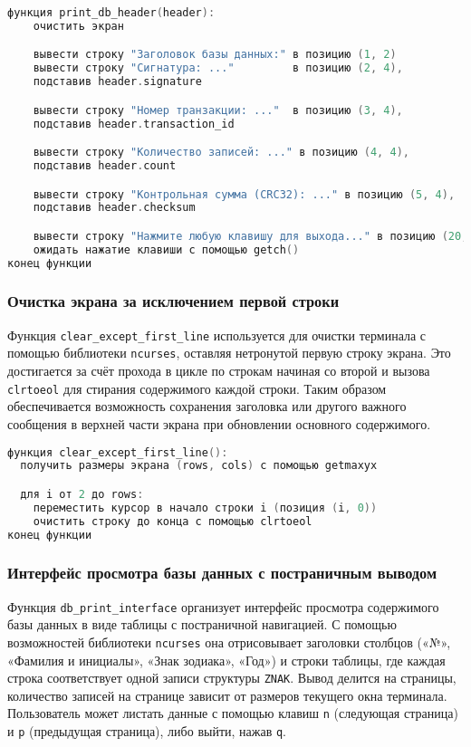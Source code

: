 \begin{lstlisting}[language=C, caption=Функция print\_db\_header]
функция print_db_header(header):
    очистить экран

    вывести строку "Заголовок базы данных:" в позицию (1, 2)
    вывести строку "Сигнатура: ..."         в позицию (2, 4),
    подставив header.signature

    вывести строку "Номер транзакции: ..."  в позицию (3, 4), 
    подставив header.transaction_id

    вывести строку "Количество записей: ..." в позицию (4, 4), 
    подставив header.count

    вывести строку "Контрольная сумма (CRC32): ..." в позицию (5, 4),
    подставив header.checksum

    вывести строку "Нажмите любую клавишу для выхода..." в позицию (20, 2)
    ожидать нажатие клавиши с помощью getch()
конец функции

\end{lstlisting}

\subsubsection*{Очистка экрана за исключением первой строки}
Функция \texttt{clear\_except\_first\_line} используется для очистки терминала с помощью библиотеки \texttt{ncurses}, оставляя нетронутой первую строку экрана. Это достигается за счёт прохода в цикле по строкам начиная со второй и вызова \texttt{clrtoeol} для стирания содержимого каждой строки. Таким образом обеспечивается возможность сохранения заголовка или другого важного сообщения в верхней части экрана при обновлении основного содержимого.

\begin{lstlisting}[language=C, caption=Функция clear\_except\_first\_line]
функция clear_except_first_line():
  получить размеры экрана (rows, cols) с помощью getmaxyx

  для i от 2 до rows:
    переместить курсор в начало строки i (позиция (i, 0))
    очистить строку до конца с помощью clrtoeol
конец функции
\end{lstlisting}

\subsubsection*{Интерфейс просмотра базы данных с постраничным выводом}
Функция \texttt{db\_print\_interface} организует интерфейс просмотра содержимого базы данных в виде таблицы с постраничной навигацией. С помощью возможностей библиотеки \texttt{ncurses} она отрисовывает заголовки столбцов («№», «Фамилия и инициалы», «Знак зодиака», «Год») и строки таблицы, где каждая строка соответствует одной записи структуры \texttt{ZNAK}. Вывод делится на страницы, количество записей на странице зависит от размеров текущего окна терминала. Пользователь может листать данные с помощью клавиш \texttt{n} (следующая страница) и \texttt{p} (предыдущая страница), либо выйти, нажав \texttt{q}.

